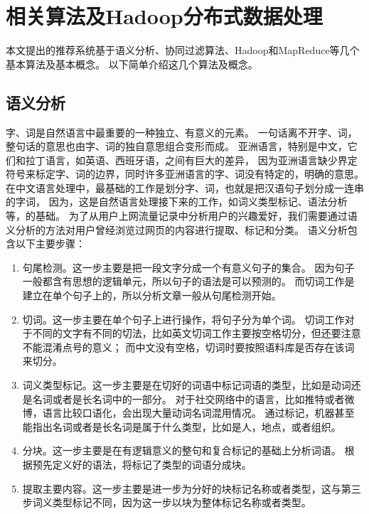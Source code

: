 \chapter{相关算法及Hadoop分布式数据处理}
本文提出的推荐系统基于语义分析、协同过滤算法、Hadoop和MapReduce等几个基本算法及基本概念。
以下简单介绍这几个算法及概念。

\section{语义分析}
字、词是自然语言中最重要的一种独立、有意义的元素。
一句话离不开字、词，整句话的意思也由字、词的独自意思组合变形而成。
亚洲语言，特别是中文，它们和拉丁语言，如英语、西班牙语，之间有巨大的差异，
因为亚洲语言缺少界定符号来标定字、词的边界，同时许多亚洲语言的字、词没有特定的，明确的意思。
在中文语言处理中，最基础的工作是划分字、词，也就是把汉语句子划分成一连串的字词，
因为，这是自然语言处理接下来的工作，如词义类型标记、语法分析等，的基础。
为了从用户上网流量记录中分析用户的兴趣爱好，我们需要通过语义分析的方法对用户曾经浏览过网页的内容进行提取、标记和分类。
语义分析包含以下主要步骤：
\begin{enumerate}
	\item 句尾检测。这一步主要是把一段文字分成一个有意义句子的集合\supercite{kiss2006unsupervised}。
	因为句子一般都含有思想的逻辑单元，所以句子的语法是可以预测的。
	而切词工作是建立在单个句子上的，所以分析文章一般从句尾检测开始。
	
	\item 切词。这一步主要在单个句子上进行操作，将句子分为单个词。
	切词工作对于不同的文字有不同的切法，比如英文切词工作主要按空格切分，但还要注意不能混淆点号的意义；
	而中文没有空格，切词时要按照语料库是否存在该词来切分。

	\item 词义类型标记。这一步主要是在切好的词语中标记词语的类型，比如是动词还是名词或者是长名词中的一部分。
	对于社交网络中的语言，比如推特或者微博，语言比较口语化，会出现大量动词名词混用情况\supercite{Gimpel2011Part,Owoputi2015Improved,Derczynski2013Twitter}。
	通过标记，机器甚至能指出名词或者是长名词是属于什么类型，比如是人，地点，或者组织。
	
	\item 分块。这一步主要是在有逻辑意义的整句和复合标记的基础上分析词语。
	根据预先定义好的语法，将标记了类型的词语分成块。

	\item 提取主要内容。这一步主要是进一步为分好的块标记名称或者类型，这与第三步词义类型标记不同，因为这一步以块为整体标记名称或者类型。
\end{enumerate}

